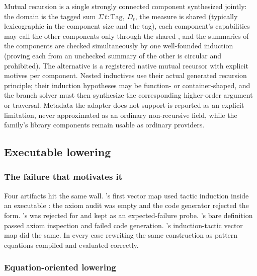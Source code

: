 Mutual recursion is a single strongly connected component synthesized jointly: the domain is the tagged sum $\Sigma\,t : \mathrm{Tag},\ D_t$, the measure is shared (typically lexicographic in the component size and the tag), each component's capabilities may call the other components only through the shared , and the summaries of the components are checked simultaneously by one well-founded induction (proving each from an unchecked summary of the other is circular and prohibited). The alternative is a registered native mutual recursor with explicit motives per component. Nested inductives use their actual generated recursion principle; their induction hypotheses may be function- or container-shaped, and the branch solver must then synthesize the corresponding higher-order argument or traversal. Metadata the adapter does not support is reported as an explicit limitation, never approximated as an ordinary non-recursive field, while the family's library components remain usable as ordinary providers.

\subsection{Executable lowering}\label{alg:rec-lowering}

\subsubsection{The failure that motivates it}

Four artifacts hit the same wall. 's first vector map used tactic induction inside an executable : the axiom audit was empty and the code generator rejected the  form. 's  was rejected for  and kept as an expected-failure probe. 's bare  definition passed axiom inspection and failed code generation. 's induction-tactic vector map did the same. In every case rewriting the same construction as pattern equations compiled and evaluated correctly.

\subsubsection{Equation-oriented lowering}

